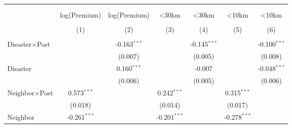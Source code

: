 
\begin{tabular}{@{\extracolsep{5pt}}lcccccc}
    \\[-1.8ex]\hline
    \hline                                                                                                                                                                                         \\[-1.8ex]
    \\[-1.8ex] & \multicolumn{1}{c}{log(Premium)} & \multicolumn{1}{c}{log(Premium)} & \multicolumn{1}{c}{<30km} & \multicolumn{1}{c}{<30km} & \multicolumn{1}{c}{<10km} & \multicolumn{1}{c}{<10km}  \\
    \\[-1.8ex] & (1) & (2) & (3) & (4) & (5) & (6) \\
    \hline                                                                                                                                                                                         \\[-1.8ex]
    Disaster$\times$Post       &                                                                      & -0.163$^{***}$    &                   & -0.145$^{***}$    &                   & -0.100$^{***}$    \\
                        &                                                                      & (0.007)           &                   & (0.005)           &                   & (0.008)           \\
    Disaster            &                                                                      & 0.160$^{***}$     &                   & -0.007$^{}$       &                   & -0.048$^{***}$    \\
                        &                                                                      & (0.006)           &                   & (0.005)           &                   & (0.006)           \\
    Neighbor$\times$Post       & 0.573$^{***}$                                                        &                   & 0.242$^{***}$     &                   & 0.315$^{***}$     &                   \\
                        & (0.018)                                                              &                   & (0.014)           &                   & (0.017)           &                   \\
    Neighbor            & -0.261$^{***}$                                                       &                   & -0.201$^{***}$    &                   & -0.278$^{***}$    &                   \\

\end{tabular}
